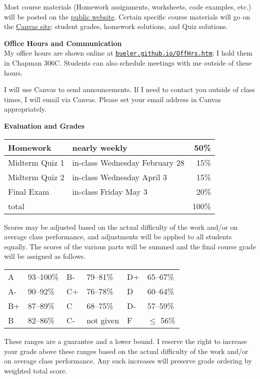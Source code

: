 \documentclass[12pt]{article}
\renewcommand{\emph}[1]{\textsf{\textbf{#1}}}
\newcommand{\localhead}[1]{\par\smallskip\textbf{#1} \smallskip\nobreak\\}%
\def\heading#1{\localhead{\large\emph{#1}}}
\begin{document}
Most course materials (Homework assignments, worksheets, code examples, etc.) will be posted on the \href{https://bueler.github.io/fa/}{public website}.  Certain specific course materials will go on the \href{https://canvas.alaska.edu/courses/18441}{Canvas site}: student grades, homework solutions, and Quiz solutions.


\clearpage\newpage
\phantom{foo}
\heading{Office Hours and Communication}
My office hours are shown online at \href{http://bueler.github.io/OffHrs.htm}{\texttt{bueler.github.io/OffHrs.htm}}; I hold them in Chapman 306C.  Students can also schedule meetings with me outside of these hours.

I will use Canvas to send announcements.  If I need to contact you outside of class times, I will email via Canvas.  Please set your email address in Canvas appropriately.


\heading{Evaluation and Grades}
\vskip -10pt

\begin{tabular}{|l|l|r|}
\hline
Homework & nearly weekly & 50\% \\
\hline
Midterm Quiz 1 & in-class Wednesday February 28 & 15\%  \\
\hline
Midterm Quiz 2 & in-class Wednesday April 3 & 15\%  \\
\hline
Final Exam     & in-class Friday May 3 & 20\% \\
\hline
total & & 100\% \\
\hline
\end{tabular}

Scores may be adjusted based on the actual difficulty of the work and/or on average class performance, and adjustments will be applied to all students equally.  The scores of the various parts will be summed and the final course grade will be assigned as follows.

\begin{tabular}{llllll}
A  & 93--100\% & B- & 79--81\%  & D+ & 65--67\%  \\
A- & 90--92\%  & C+ & 76--78\%  & D  & 60--64\%  \\
B+ & 87--89\%  & C  & 68--75\%  & D- & 57--59\%  \\
B  & 82--86\%  & C- & not given & F  & $\le$ 56\%
\end{tabular}

These ranges are a guarantee and a lower bound.  I reserve the right to increase your grade above these ranges based on the actual difficulty of the work and/or on average class performance.  Any such increases will preserve grade ordering by weighted total score.
\end{document}
